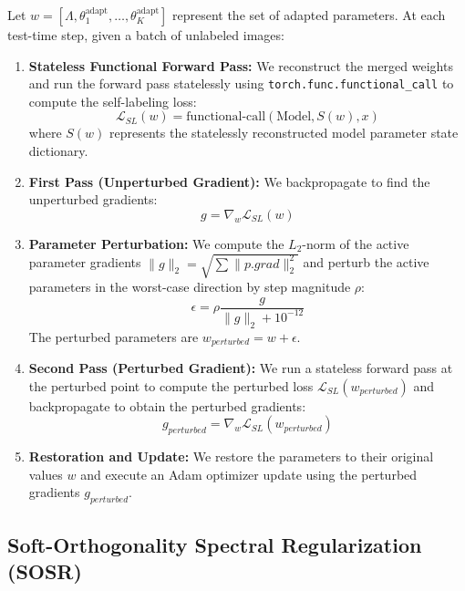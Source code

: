 \documentclass{article}
\theoremstyle{plain}
\theoremstyle{definition}
\theoremstyle{remark}
\begin{document}
Let $w = [\Lambda, \theta_1^{\text{adapt}}, \dots, \theta_K^{\text{adapt}}]$ represent the set of adapted parameters. At each test-time step, given a batch of unlabeled images:
\begin{enumerate}
  \item \textbf{Stateless Functional Forward Pass:} We reconstruct the merged weights and run the forward pass statelessly using \texttt{torch.func.functional\_call} to compute the self-labeling loss:
    \begin{equation}
      \mathcal{L}_{SL}(w) = \text{functional-call}(\text{Model}, S(w), x)
    \end{equation}
    where $S(w)$ represents the statelessly reconstructed model parameter state dictionary.
  \item \textbf{First Pass (Unperturbed Gradient):} We backpropagate to find the unperturbed gradients:
    \begin{equation}
      g = \nabla_w \mathcal{L}_{SL}(w)
    \end{equation}
  \item \textbf{Parameter Perturbation:} We compute the $L_2$-norm of the active parameter gradients $\|g\|_2 = \sqrt{\sum \|p.grad\|_2^2}$ and perturb the active parameters in the worst-case direction by step magnitude $\rho$:
    \begin{equation}
      \epsilon = \rho \frac{g}{\|g\|_2 + 10^{-12}}
    \end{equation}
    The perturbed parameters are $w_{perturbed} = w + \epsilon$.
  \item \textbf{Second Pass (Perturbed Gradient):} We run a stateless forward pass at the perturbed point to compute the perturbed loss $\mathcal{L}_{SL}(w_{perturbed})$ and backpropagate to obtain the perturbed gradients:
    \begin{equation}
      g_{perturbed} = \nabla_w \mathcal{L}_{SL}(w_{perturbed})
    \end{equation}
  \item \textbf{Restoration and Update:} We restore the parameters to their original values $w$ and execute an Adam optimizer update using the perturbed gradients $g_{perturbed}$.
\end{enumerate}

\subsection{Soft-Orthogonality Spectral Regularization (SOSR)}
\end{document}

